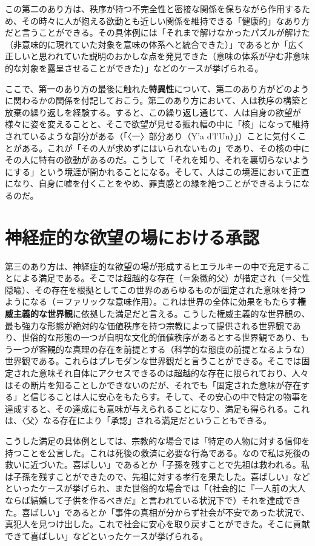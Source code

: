 \documentclass[
]{ltjsarticle}
\begin{document}
この第二のあり方は、秩序が持つ不完全性と密接な関係を保ちながら作用するため、その時々に人が抱える欲動とも近しい関係を維持できる「健康的」なあり方だと言うことができる。その具体例には「それまで解けなかったパズルが解けた（非意味的に現れていた対象を意味の体系へと統合できた）」であるとか「広く正しいと思われていた説明のおかしな点を発見できた（意味の体系が孕む非意味的な対象を露呈させることができた）」などのケースが挙げられる。

ここで、第一のあり方の最後に触れた\textbf{特異性}について、第二のあり方がどのように関わるかの関係を付記しておこう。第二のあり方において、人は秩序の構築と放棄の繰り返しを経験する。すると、この繰り返し通じて、人は自身の欲望が様々に姿を変えることと、そこで欲望が見せる振れ幅の中に「核」になって維持されているような部分がある（「〈一〉部分あり（Y'a
d'l'Un）」）ことに気付くことがある。これが「その人が求めずにはいられないもの」であり、その核の中にその人に特有の欲動があるのだ。こうして「それを知り、それを裏切らないようにする」という境涯が開かれることになる。そして、人はこの境涯において正直になり、自身に嘘を付くことをやめ、罪責感との縁を絶つことができるようになるのだ。

\section{神経症的な欲望の場における承認}\label{ux795eux7d4cux75c7ux7684ux306aux6b32ux671bux306eux5834ux306bux304aux3051ux308bux627fux8a8d}

第三のあり方は、神経症的な欲望の場が形成するヒエラルキーの中で充足することによる満足である。そこでは超越的な存在（＝象徴的父）が措定され（＝父性隠喩）、その存在を根拠としてこの世界のあらゆるものが固定された意味を持つようになる（＝ファリックな意味作用）。これは世界の全体に効果をもたらす\textbf{権威主義的な世界観}に依拠した満足だと言える。こうした権威主義的な世界観の、最も強力な形態が絶対的な価値秩序を持つ宗教によって提供される世界観であり、世俗的な形態の一つが自明な文化的価値秩序があるとする世界観であり、もう一つが客観的な真理の存在を前提とする（科学的な態度の前提となるような）世界観である。これらはプレモダンな世界観だと言うことができる。そこでは固定された意味それ自体にアクセスできるのは超越的な存在に限られており、人々はその断片を知ることしかできないのだが、それでも「固定された意味が存在する」と信じることは人に安心をもたらす。そして、その安心の中で特定の物事を達成すると、その達成にも意味が与えられることになり、満足も得られる。これは、〈父〉なる存在により「承認」される満足だということもできる。

こうした満足の具体例としては、宗教的な場合では「特定の人物に対する信仰を持つことを公言した。これは死後の救済に必要な行為である。なので私は死後の救いに近づいた。喜ばしい」であるとか「子孫を残すことで先祖は救われる。私は子孫を残すことができたので、先祖に対する孝行を果たした。喜ばしい」などといったケースが挙げられ、また世俗的な場合では「（社会的に『一人前の大人ならば結婚して子供を作るべきだ』と言われている状況下で）それを達成できた。喜ばしい」であるとか「事件の真相が分からず社会が不安であった状況で、真犯人を見つけ出した。これで社会に安心を取り戻すことができた。そこに貢献できて喜ばしい」などといったケースが挙げられる。
\end{document}
